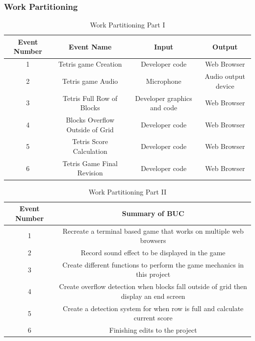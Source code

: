 \documentclass[12pt, titlepage]{article}
\begin{document}
\subsubsection*{Work Partitioning}
\begin{table}[H]
\caption{Work Partitioning Part I}
\begin{center}
\begin{tabular}{|c|c|c|c|}
\hline
Event Number & Event Name & Input & Output\\
\hline
1 & Tetris game Creation & Developer code & Web Browser\\
\hline
2 & Tetris game Audio & Microphone & Audio output device\\
\hline
3 & Tetris Full Row of Blocks & Developer graphics and code & Web Browser\\
\hline
4 & Blocks Overflow Outside of Grid & Developer code & Web Browser\\
\hline
5 & Tetris Score Calculation & Developer code & Web Browser\\
\hline
6 & Tetris Game Final Revision & Developer code & Web Browser\\
\hline
\end{tabular}
\end{center}
\label{default}
\end{table}%

\begin{table}[H]
\caption{Work Partitioning Part II}
\begin{center}
\begin{tabular}{|c|c|}

\hline
Event Number & Summary of BUC\\
\hline
1 & Recreate a terminal based game that works on multiple web browsers\\ 
\hline
2 & Record sound effect to be displayed in the game\\
\hline
3 & Create different functions to perform the game mechanics in this project\\
\hline
4 & Create overflow detection when blocks fall outside of grid then display an end screen\\
\hline
5 & Create a detection system for when row is full and calculate current score\\
\hline
6 & Finishing edits to the project\\
\hline

\end{tabular}
\end{center}
\label{default}
\end{table}%
\end{document}
